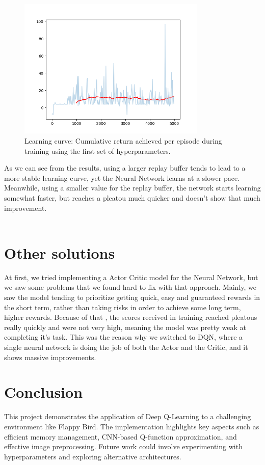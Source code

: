 \documentclass[a4paper,12pt]{article}
\begin{document}
\begin{figure}[ht!]
    \centering
    \includegraphics[width=0.8\textwidth]{second_plot.png} 
    \caption{Learning curve: Cumulative return achieved per episode during training using the first set of hyperparameters.}
    \label{fig:learning_curve2}
\end{figure}
As we can see from the results, using a larger replay buffer tends to lead to a more stable learning curve, yet the Neural Network learns at a
slower pace. Meanwhile, using a smaller value for the replay buffer, the network starts learning somewhat faster, but reaches a pleatou much quicker
and doesn't show that much improvement. 
\\ \\
\section{Other solutions}
At first, we tried implementing a Actor Critic model for the Neural Network, but we saw some problems that we found hard to fix with that approach.
Mainly, we saw the model tending to prioritize getting quick, easy and guaranteed rewards in the short term, rather than taking risks in order to achieve some long term, higher
rewards. Because of that , the scores received in training reached pleatous really quickly and were not very high, meaning the model was pretty weak at completing it's task.
This was the reason why we switched to DQN, where a single neural network is doing the job of both the Actor and the Critic, and it shows massive improvements.
\section{Conclusion}
This project demonstrates the application of Deep Q-Learning to a challenging environment like Flappy Bird. The implementation highlights key aspects such as efficient memory management, CNN-based Q-function approximation, and effective image preprocessing. Future work could involve experimenting with hyperparameters and exploring alternative architectures.
\end{document}

